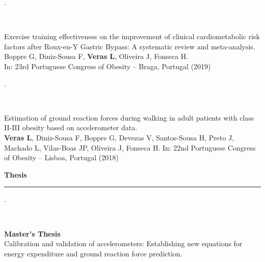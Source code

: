 \documentclass[10t]{article}
\begin{document}
\vspace{0.5em}

\noindent
\begin{minipage}[t]{0.15\linewidth}
	.
\end{minipage}
\
\begin{minipage}[t]{0.85\linewidth}
\begin{minipage}[t]{\columnwidth}
	Exercise training effectiveness on the improvement of clinical cardiometabolic risk factors after Roux-en-Y Gastric Bypass: A systematic review and meta-analysis. \\
	Boppre G, Diniz-Sousa F, \textbf{Veras L}, Oliveira J, Fonseca H.  \\
	In: 23rd Portuguese Congress of Obesity – Braga, Portugal (2019)
\end{minipage}
\end{minipage}

\vspace{0.5em}

\noindent
\begin{minipage}[t]{0.15\linewidth}
	.
\end{minipage}
\
\begin{minipage}[t]{0.85\linewidth}
\begin{minipage}[t]{\columnwidth}
	Estimation of ground reaction forces during walking in adult patients with class II-III obesity based on accelerometer data. \\
	\textbf{Veras L}, Diniz-Sousa F, Boppre G, Devezas V, Santos-Sousa H, Preto J, Machado L, Vilas-Boas JP, Oliveira J, Fonseca H.  
	In: 22nd Portuguese Congress of Obesity – Lisboa, Portugal (2018)
\end{minipage}
\end{minipage}

\vspace{0.5em}

\noindent
\textbf{Thesis} \rule{15cm}{0.8pt}

\vspace{1em}

\noindent
\begin{minipage}[t]{0.15\linewidth}
	.
\end{minipage}
\
\begin{minipage}[t]{0.85\linewidth}
\begin{minipage}[t]{\columnwidth}
	\textbf{Master's Thesis} \\
	Calibration and validation of accelerometers: Establishing new equations for energy expenditure and ground reaction force prediction.
\end{minipage}
\end{minipage}
\end{document}
